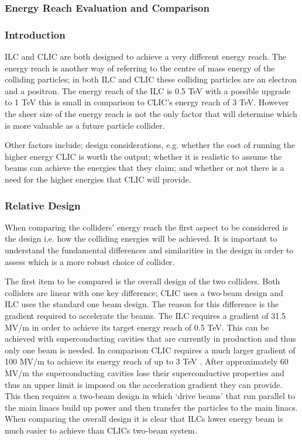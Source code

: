 \subsubsection{Energy Reach Evaluation and Comparison}

\subsubsection{Introduction}
ILC and CLIC are both designed to achieve a very different energy reach. The energy reach is another way of referring to the centre of mass energy of the colliding particles; in both ILC and CLIC these colliding particles are an electron and a positron.  The energy reach of the ILC is 0.5 TeV with a possible upgrade to 1 TeV this is small in comparison to CLIC's energy reach of 3 TeV. However the sheer size of the energy reach is not the only factor that will determine which is more valuable as a future particle collider.

Other factors include; design considerations, e.g. whether the cost of running the higher energy CLIC is worth the output; whether it is realistic to assume the beams can achieve the energies that they claim; and whether or not there is a need for the higher energies that CLIC will provide.

\subsubsection{Relative Design}
When comparing the colliders' energy reach the first aspect to be considered is the design i.e. how the colliding energies will be achieved. It is important to understand the fundamental differences and similarities in the design in order to assess which is a more robust choice of collider.

The first item to be compared is the overall design of the two colliders. Both colliders are linear with one key difference; CLIC uses a two-beam design and ILC uses the standard one beam design. The reason for this difference is the gradient required to accelerate the beams. The ILC requires a gradient of 31.5 MV/m \cite{ILC:ReferenceDesignReport} in order to achieve its target energy reach of 0.5 TeV. This can be achieved with superconducting cavities that are currently in production and thus only one beam is needed. In comparison CLIC requires a much larger gradient of 100 MV/m to achieve its energy reach of up to 3 TeV \cite{CLIC:ParameterList}. After approximately 60 MV/m the superconducting cavities lose their superconductive properties and thus an upper limit is imposed on the acceleration gradient they can provide. This then requires a two-beam design in which `drive beams' that run parallel to the main linacs build up power and then transfer the particles to the main linacs. When comparing the overall design it is clear that ILCs lower energy beam is much easier to achieve than CLICs two-beam system.

